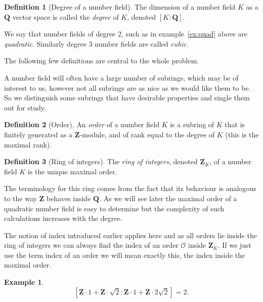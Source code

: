 \documentclass[a4paper,abstracton,bibtotoc]{scrreprt}
\theoremstyle{definition}
\newtheorem{defn}{Definition}
\newtheorem{ex}{Example}
\newcommand{\QQ}{\mathbf{Q}}
\newcommand{\ZZ}{\mathbf{Z}}
\renewcommand{\O}{\mathcal{O}}
\begin{document}
\begin{defn}[Degree of a number field]
The dimension of a number field $K$ as a $\QQ$ vector space is called the \emph{degree} of $K$, denoted $[K:\QQ]$.

We say that number fields of degree 2, such as in example~\ref{ex:quad} above are \emph{quadratic}.
Similarly degree 3 number fields are called \emph{cubic}.
\end{defn}

\minisec{}
The following few definitions are central to the whole problem.

A number field will often have a large number of subrings, which may be of interest to us, however not all subrings are as nice as we would like them to be.
So we distinguish some subrings that have desirable properties and single them out for study.

\begin{defn}[Order]
An \emph{order} of a number field $K$ is a subring of $K$ that is finitely generated as a $\ZZ$-module, and of rank equal to the degree of $K$ (this is the maximal rank).
\end{defn}


\begin{defn}[Ring of integers]
The \emph{ring of integers}, denoted $\ZZ_K$, of a number field $K$ is the unique maximal order.
\end{defn}

The terminology for this ring comes from the fact that its behaviour is analogous to the way $\ZZ$ behaves inside $\QQ$.
As we will see later the maximal order of a quadratic number field is easy to determine but the complexity of such calculations increases with the degree.

The notion of index introduced earlier applies here and as all orders lie inside the ring of integers we can always find the index of an order $\O$ inside $\ZZ_K$.
If we just use the term index of an order we will mean exactly this, the index inside the maximal order.

\begin{ex}
\[
[\ZZ\cdot 1 + \ZZ\cdot \sqrt{2} : \ZZ \cdot 1 + \ZZ \cdot 2\sqrt{2}] = 2.
\]
\end{ex}
\end{document}
